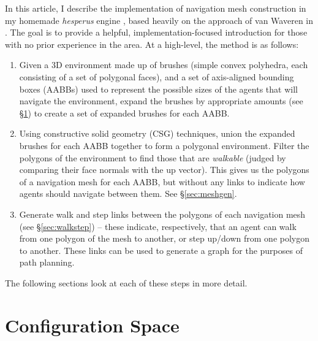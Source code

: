 \documentclass[10pt,twocolumn]{article}
\begin{document}
In this article, I describe the implementation of navigation mesh construction in my homemade \emph{hesperus} engine \cite{hesperus}, based heavily on the approach of van Waveren in \cite{vanwaveren01}. The goal is to provide a helpful, implementation-focused introduction for those with no prior experience in the area. At a high-level, the method is as follows:
%
\begin{enumerate}
\item Given a 3D environment made up of brushes (simple convex polyhedra, each consisting of a set of polygonal faces), and a set of axis-aligned bounding boxes (AABBs) used to represent the possible sizes of the agents that will navigate the environment, expand the brushes by appropriate amounts (see \S\ref{sec:configspace}) to create a set of expanded brushes for each AABB.
\item Using constructive solid geometry (CSG) techniques, union the expanded brushes for each AABB together to form a polygonal environment. Filter the polygons of the environment to find those that are \emph{walkable} (judged by comparing their face normals with the up vector). This gives us the polygons of a navigation mesh for each AABB, but without any links to indicate how agents should navigate between them. See \S\ref{sec:meshgen}.
\item Generate walk and step links between the polygons of each navigation mesh (see \S\ref{sec:walkstep}) -- these indicate, respectively, that an agent can walk from one polygon of the mesh to another, or step up/down from one polygon to another. These links can be used to generate a graph for the purposes of path planning.
\end{enumerate}
%
The following sections look at each of these steps in more detail.

\section{Configuration Space}
\label{sec:configspace}
\end{document}
